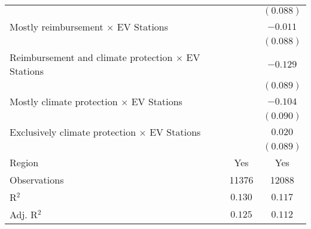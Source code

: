 \begin{center}
\begin{tiny}
\begin{longtable}{l@{} c@{} c@{}}
                                                                                                       &                  & $(0.088)$        \\
\quad Mostly reimbursement $\times$ EV Stations                                                        &                  & $-0.011$         \\
                                                                                                       &                  & $(0.088)$        \\
\quad Reimbursement and climate protection $\times$ EV Stations                                        &                  & $-0.129$         \\
                                                                                                       &                  & $(0.089)$        \\
\quad Mostly climate protection $\times$ EV Stations                                                   &                  & $-0.104$         \\
                                                                                                       &                  & $(0.090)$        \\
Exclusively climate protection $\times$ EV Stations                                                    &                  & $0.020$          \\
                                                                                                       &                  & $(0.089)$        \\
\hline
Region                                                                                                 & Yes              & Yes              \\
Observations                                                                                           & 11376            & 12088            \\
R$^2$                                                                                                  & $0.130$          & $0.117$          \\
Adj. R$^2$                                                                                             & $0.125$          & $0.112$          \\
\end{longtable}
\end{tiny}
\end{center}
